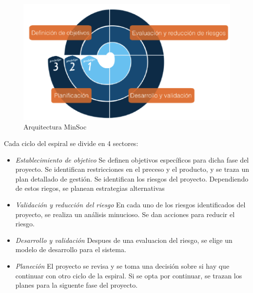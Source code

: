 \begin{figure}[h!]
 \begin{center}
  \includegraphics[width=1\textwidth,keepaspectratio=true]{./images/ESPIRAL}
  \caption{Arquitectura MinSoc}
  \label{fig:esquema}
 \end{center}
\end{figure}


Cada ciclo del espiral se divide en 4 sectores:
 
\begin {itemize}
\item 
\textit{Establecimiento de objetivo}  Se definen objetivos específicos para dicha fase del proyecto. Se identifican restricciones en el preceso y el producto, y se traza un plan detallado de gestión. Se identifican los riesgos del proyecto. Dependiendo de estos riegos, se planean estrategias alternativas
\item 
\textit{Validación y reducción del riesgo}  En cada uno de los riesgos identificados del proyecto, se realiza un análisis minucioso. Se dan acciones para reducir el riesgo.
\item 
\textit{Desarrollo y validación}  Despues de una evaluacion del riesgo, se elige un modelo de desarrollo para el sistema.
\item 
\textit{Planeción}  El proyecto se revisa y se toma una decisión sobre si hay que continuar con otro ciclo de la espiral. Si se opta por continuar, se trazan los planes para la siguente fase del proyecto.
 \end {itemize}

